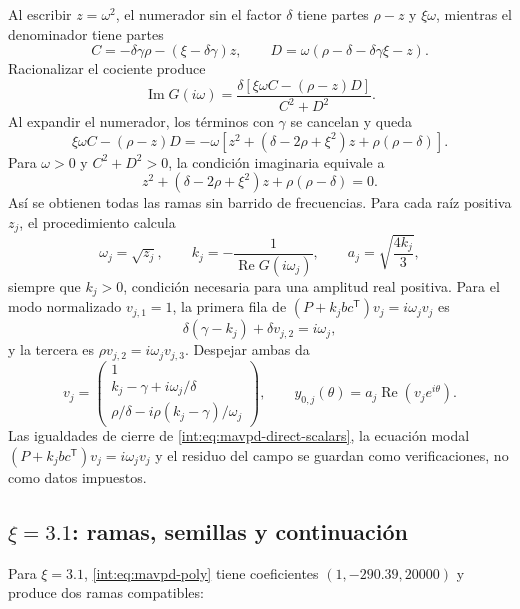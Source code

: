 Al escribir \(z=\omega^2\), el numerador sin el factor \(\delta\) tiene
partes \(\rho-z\) y \(\xi\omega\), mientras el denominador tiene partes
\[
 C=-\delta\gamma\rho-(\xi-\delta\gamma)z,\qquad
 D=\omega(\rho-\delta-\delta\gamma\xi-z).
\]
Racionalizar el cociente produce
\[
 \operatorname{Im}G(i\omega)=
 \frac{\delta[\xi\omega C-(\rho-z)D]}{C^2+D^2}.
\]
Al expandir el numerador, los términos con \(\gamma\) se cancelan y queda
\[
 \xi\omega C-(\rho-z)D
 =-\omega[z^2+(\delta-2\rho+\xi^2)z+\rho(\rho-\delta)].
\]
Para \(\omega>0\) y \(C^2+D^2>0\), la condición imaginaria equivale a
\begin{equation}
 z^2+(\delta-2\rho+\xi^2)z+\rho(\rho-\delta)=0.
 \label{int:eq:mavpd-poly}
\end{equation}
Así se obtienen todas las ramas sin barrido de frecuencias. Para cada raíz
positiva \(z_j\), el procedimiento calcula
\begin{equation}
 \omega_j=\sqrt{z_j},\qquad
 k_j=-\frac{1}{\operatorname{Re}G(i\omega_j)},\qquad
 a_j=\sqrt{\frac{4k_j}{3}},
 \label{int:eq:mavpd-direct-scalars}
\end{equation}
siempre que \(k_j>0\), condición necesaria para una amplitud real positiva.
Para el modo normalizado \(v_{j,1}=1\), la primera fila de
\((P+k_jbc^{\mathsf T})v_j=i\omega_jv_j\) es
\[
 \delta(\gamma-k_j)+\delta v_{j,2}=i\omega_j,
\]
y la tercera es \(\rho v_{j,2}=i\omega_jv_{j,3}\). Despejar ambas da
\begin{equation}
 v_j=\begin{pmatrix}
 1\\
 k_j-\gamma+i\omega_j/\delta\\
 \rho/\delta-i\rho(k_j-\gamma)/\omega_j
 \end{pmatrix},\qquad
 y_{0,j}(\theta)=a_j\operatorname{Re}\!\left(v_je^{i\theta}\right).
 \label{int:eq:mavpd-direct-seed}
\end{equation}
Las igualdades de cierre de \eqref{int:eq:mavpd-direct-scalars}, la ecuación modal
\((P+k_jbc^{\mathsf T})v_j=i\omega_jv_j\) y el residuo del campo se guardan
como verificaciones, no como datos impuestos.

\subsection{\texorpdfstring{\(\xi=3.1\): ramas, semillas y continuación}{xi=3.1: ramas, semillas y continuación}}

Para \(\xi=3.1\), \eqref{int:eq:mavpd-poly} tiene coeficientes
\((1,-290.39,20000)\) y produce dos ramas compatibles:

